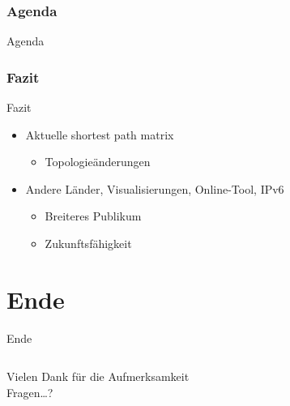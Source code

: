 \documentclass[ngerman,compress,hyperref={bookmarks}]{beamer}
\begin{document}
\section*{Agenda}
\begin{frame}{Agenda} \setcounter{tocdepth}{1} \tableofcontents[part=1] \setcounter{tocdepth}{3} \end{frame}

\section{Fazit}
\begin{frame}{Fazit}
\begin{itemize}
 \item Aktuelle shortest path matrix
 \begin{itemize}
  \item Topologieänderungen
 \end{itemize}\vspace{1cm}
 \item Andere Länder, Visualisierungen, Online-Tool, IPv6
 \begin{itemize}
  \item Breiteres Publikum
  \item Zukunftsfähigkeit
 \end{itemize}
\end{itemize}
\end{frame}

\part{Ende}
\begin{frame}{Ende}
\begin{columns}[t]
\begin{column}{0.5\textwidth}
 \begin{center}
 \vspace{1cm}
 Vielen Dank für die Aufmerksamkeit\\
 \vspace{1.5cm}
 Fragen\ldots?
 \end{center}
\end{column}
\begin{column}{0.5\textwidth}
 \vspace{-1cm}
 \begin{figure}
  \label{asngraph_all}
 \end{figure}
\end{column}
\end{columns}
\end{frame}
\end{document}
